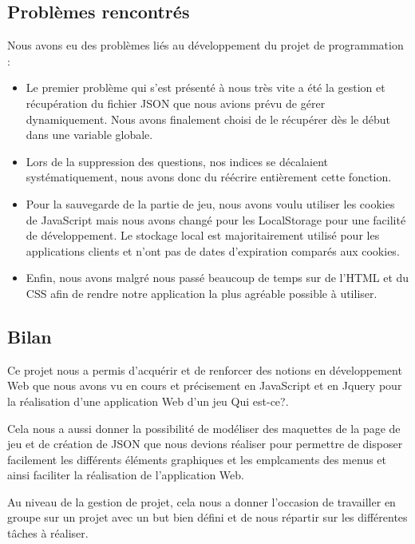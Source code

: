 \documentclass{article}
\begin{document}
        \subsection{Problèmes rencontrés}
            Nous avons eu des problèmes liés au développement du projet de programmation :
            \begin{itemize}
                \item Le premier problème qui s'est présenté à nous très vite a été la gestion et récupération du fichier JSON que nous avions prévu de gérer dynamiquement. Nous avons finalement choisi de le récupérer dès le début dans une variable globale.
                \item Lors de la suppression des questions, nos indices se décalaient systématiquement, nous avons donc du réécrire entièrement cette fonction.
                \item Pour la sauvegarde de la partie de jeu, nous avons voulu utiliser les cookies de JavaScript mais nous avons changé pour les LocalStorage pour une facilité de développement. Le stockage local est majoritairement utilisé pour les applications clients et n'ont pas de dates d'expiration comparés aux cookies.
                \item Enfin, nous avons malgré nous passé beaucoup de temps sur de l'HTML et du CSS afin de rendre notre application la plus agréable possible à utiliser. 
            \end{itemize}
        \subsection{Bilan}
            \par Ce projet nous a permis d'acquérir et de renforcer des notions en développement Web que nous avons vu en cours  et précisement en JavaScript et en Jquery pour la réalisation d'une application Web d'un jeu Qui est-ce?.\\
            \par Cela nous a aussi donner la possibilité de modéliser des maquettes de la page de jeu et de création de JSON que nous devions réaliser pour permettre de disposer facilement les différents éléments graphiques et les emplcaments des menus et ainsi faciliter la réalisation de l'application Web.\\
            \par Au niveau de la gestion de projet, cela nous a donner l'occasion de travailler en groupe sur un projet avec un but bien défini et de nous répartir sur les différentes tâches à réaliser.
\end{document}
